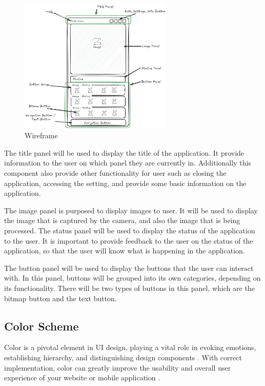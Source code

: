 \begin{figure}[!ht]
    \centering
    \includegraphics[width=0.65\textwidth]{texs/Part2/chapter3/image/wireframe.png}
    \caption{Wireframe}
    \label{fig:wireframe}
\end{figure}

The title panel will be used to display the title of the application. It provide information to the user on which panel they are currently in. Additionally this component also provide other functionality for user such as closing the application, accessing the setting, and provide some basic information on the application.

The image panel is purposed to display images to user. It will be used to display the image that is captured by the camera, and also the image that is being processed. The status panel will be used to display the status of the application to the user. It is important to provide feedback to the user on the status of the application, so that the user will know what is happening in the application.

The button panel will be used to display the buttons that the user can interact with. In this panel, buttons will be grouped into its own categories, depending on its functionality. There will be two types of buttons in this panel, which are the bitmap button and the text button.

\subsection{Color Scheme}

Color is a pivotal element in UI design, playing a vital role in evoking emotions, establishing hierarchy, and distinguishing design components \cite{M._2023}. With correct implementation, color can greatly improve the usability and overall user experience of your website or mobile application \cite{M._2023}.

